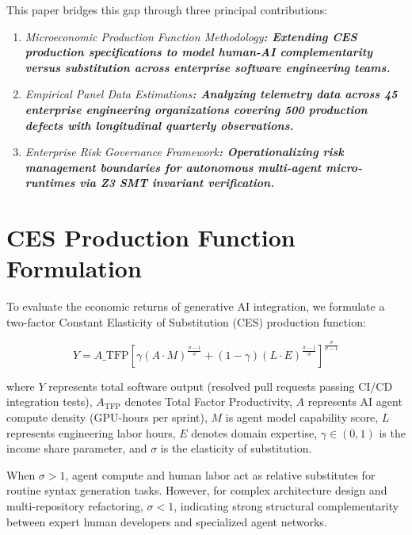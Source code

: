 \documentclass[10pt,twocolumn,letterpaper]{article}
\begin{document}
This paper bridges this gap through three principal contributions:

\begin{enumerate}
  \item \textit{Microeconomic Production Function Methodology\textbf{: Extending CES production specifications to model human-AI complementarity versus substitution across enterprise software engineering teams.}}
  \item \textit{Empirical Panel Data Estimations\textbf{: Analyzing telemetry data across 45 enterprise engineering organizations covering 500 production defects with longitudinal quarterly observations.}}
  \item \textit{Enterprise Risk Governance Framework\textbf{: Operationalizing risk management boundaries for autonomous multi-agent micro-runtimes via Z3 SMT invariant verification. \cite{crossref_10_2139_ssrn_6374778}}}
\end{enumerate}




\section{CES Production Function Formulation}


To evaluate the economic returns of generative AI integration, we formulate a two-factor Constant Elasticity of Substitution (CES) production function:

\begin{equation}
Y = A\_{\text{TFP}} \left[ \gamma (A \cdot M)^{\frac{\sigma-1}{\sigma}} + (1-\gamma)(L \cdot E)^{\frac{\sigma-1}{\sigma}} \right]^{\frac{\sigma}{\sigma-1}}
\end{equation}

where $Y$ represents total software output (resolved pull requests passing CI/CD integration tests), $A_{\text{TFP}}$ denotes Total Factor Productivity, $A$ represents AI agent compute density (GPU-hours per sprint), $M$ is agent model capability score, $L$ represents engineering labor hours, $E$ denotes domain expertise, $\gamma \in (0,1)$ is the income share parameter, and $\sigma$ is the elasticity of substitution.

When $\sigma > 1$, agent compute and human labor act as relative substitutes for routine syntax generation tasks. However, for complex architecture design and multi-repository refactoring, $\sigma < 1$, indicating strong structural complementarity between expert human developers and specialized agent networks.
\end{document}
